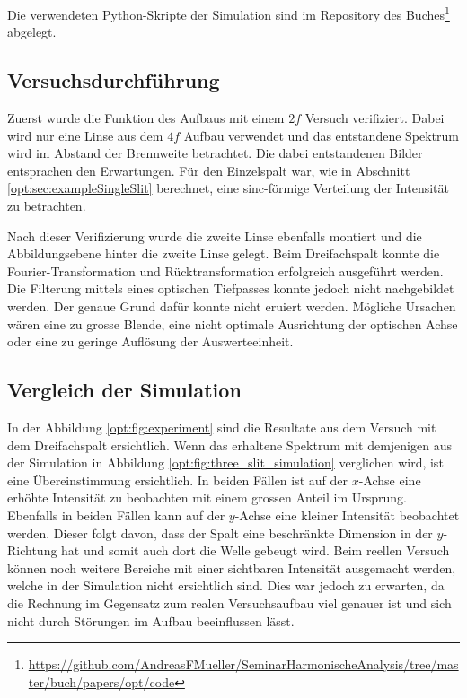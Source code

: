 Die verwendeten Python-Skripte der Simulation sind im Repository des Buches\footnote{\url{https://github.com/AndreasFMueller/SeminarHarmonischeAnalysis/tree/master/buch/papers/opt/code}}
abgelegt.

\subsection{Versuchsdurchführung}
Zuerst wurde die Funktion des Aufbaus mit einem $2f$ Versuch verifiziert.
Dabei wird nur eine Linse aus dem $4f$ Aufbau verwendet und das entstandene Spektrum wird im Abstand der Brennweite betrachtet.
Die dabei entstandenen Bilder entsprachen den Erwartungen.
Für den Einzelspalt war, wie in Abschnitt \ref{opt:sec:exampleSingleSlit} berechnet, eine sinc-förmige Verteilung der Intensität zu betrachten.

Nach dieser Verifizierung wurde die zweite Linse ebenfalls montiert und die Abbildungsebene hinter die zweite Linse gelegt.
Beim Dreifachspalt konnte die Fourier-Transformation und Rücktransformation erfolgreich ausgeführt werden.
Die Filterung mittels eines optischen Tiefpasses konnte jedoch nicht nachgebildet werden.
Der genaue Grund dafür konnte nicht eruiert werden.
Mögliche Ursachen wären eine zu grosse Blende, eine nicht optimale Ausrichtung der optischen Achse oder eine zu geringe Auflösung der Auswerteeinheit.

\subsection{Vergleich der Simulation}
In der Abbildung \ref{opt:fig:experiment} sind die Resultate aus dem Versuch mit dem Dreifachspalt ersichtlich.
Wenn das erhaltene Spektrum mit demjenigen aus der Simulation in Abbildung \ref{opt:fig:three_slit_simulation} verglichen wird, ist eine Übereinstimmung ersichtlich.
In beiden Fällen ist auf der $x$-Achse eine erhöhte Intensität zu beobachten mit einem grossen Anteil im Ursprung.
Ebenfalls in beiden Fällen kann auf der $y$-Achse eine kleiner Intensität beobachtet werden.
Dieser folgt davon, dass der Spalt eine beschränkte Dimension in der $y$-Richtung hat und somit auch dort die Welle gebeugt wird.
Beim reellen Versuch können noch weitere Bereiche mit einer sichtbaren Intensität ausgemacht werden, welche in der Simulation nicht ersichtlich sind.
Dies war jedoch zu erwarten, da die Rechnung im Gegensatz zum realen Versuchsaufbau viel genauer ist und sich nicht durch Störungen im Aufbau beeinflussen lässt.


